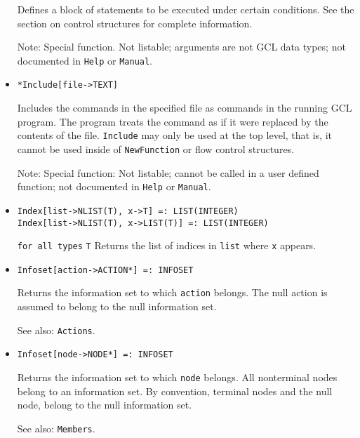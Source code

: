 \begin{itemize}
\bd
Defines a block of statements to be executed under certain conditions.
See the section on control structures for complete information. 
\item [Note:] Special function.  Not listable; arguments are not GCL
data types; not documented in \verb+Help+ or \verb+Manual+.  
\ed


\item{}
\protect \large \begin{verbatim}
*Include[file->TEXT]
\end{verbatim}\normalsize

\bd
Includes the commands in the specified file as commands
in the running GCL program.  The program treats the command as if it
were replaced by the contents of the file.  \verb+Include+ may only be used
at the top level, that is, it cannot be used inside of \verb+NewFunction+
or flow control structures.
\item [Note:] Special function:  Not listable; cannot be called in a
user defined function; not documented in \verb+Help+ or \verb+Manual+. 
\ed


\item{}
\protect \large \begin{verbatim}
Index[list->NLIST(T), x->T] =: LIST(INTEGER) 
Index[list->NLIST(T), x->LIST(T)] =: LIST(INTEGER) 
\end{verbatim} \normalsize

{\tt for all types} {\tt T}
\bd
Returns the list of indices in \verb+list+ where \verb+x+ appears.
\ed

\item{}
\protect \large \begin{verbatim}
Infoset[action->ACTION*] =: INFOSET 
\end{verbatim} \normalsize

\bd
Returns the information set to which \verb+action+ belongs.  The null
action is assumed to belong to the null information set.
\item [See also:] \verb+Actions+.
\ed

\item{}
\protect \large \begin{verbatim}
Infoset[node->NODE*] =: INFOSET 
\end{verbatim}\normalsize

\bd
Returns the information set to which \verb+node+ belongs.  All
nonterminal nodes belong to an information set.  By convention,
terminal nodes and the null node, belong to the null information set.
\item [See also:] \verb+Members+.
\ed


\end{itemize}
